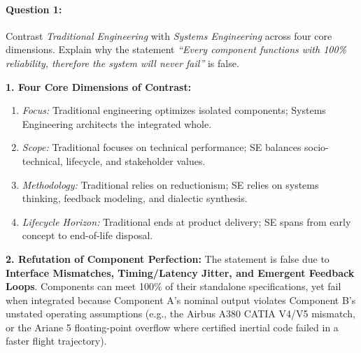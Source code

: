 \paragraph{Question 1:} Contrast \textit{Traditional Engineering} with \textit{Systems Engineering} across four core dimensions. Explain why the statement \textit{``Every component functions with 100\% reliability, therefore the system will never fail''} is false.
\vspace{0.3em}
\begin{tcolorbox}[colback=white,colframe=seSecondary,title={\small \textbf{Model Solution to Question 1:}}]
\textbf{1. Four Core Dimensions of Contrast:}
\begin{enumerate}[label=(\alph*), itemsep=1pt]
    \item \textit{Focus:} Traditional engineering optimizes isolated components; Systems Engineering architects the integrated whole.
    \item \textit{Scope:} Traditional focuses on technical performance; SE balances socio-technical, lifecycle, and stakeholder values.
    \item \textit{Methodology:} Traditional relies on reductionism; SE relies on systems thinking, feedback modeling, and dialectic synthesis.
    \item \textit{Lifecycle Horizon:} Traditional ends at product delivery; SE spans from early concept to end-of-life disposal.
\end{enumerate}
\textbf{2. Refutation of Component Perfection:}
The statement is false due to \textbf{Interface Mismatches, Timing/Latency Jitter, and Emergent Feedback Loops}. Components can meet 100\% of their standalone specifications, yet fail when integrated because Component A's nominal output violates Component B's unstated operating assumptions (e.g., the Airbus A380 CATIA V4/V5 mismatch, or the Ariane 5 floating-point overflow where certified inertial code failed in a faster flight trajectory).
\end{tcolorbox}

